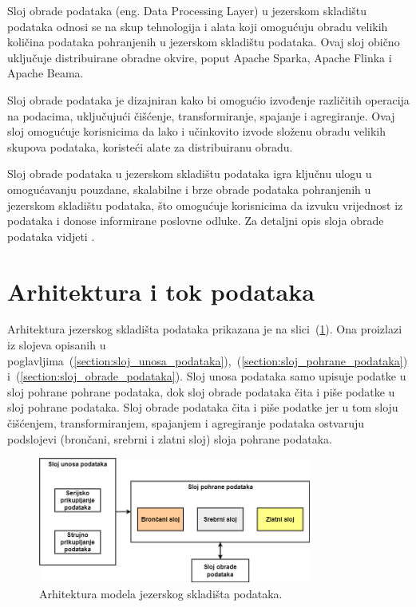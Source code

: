 Sloj obrade podataka (eng. Data Processing Layer) u jezerskom skladištu podataka
odnosi se na skup tehnologija i alata koji omogućuju obradu velikih količina
podataka pohranjenih u jezerskom skladištu podataka. Ovaj sloj obično uključuje
distribuirane obradne okvire, poput Apache Sparka, Apache Flinka i Apache Beama.

Sloj obrade podataka je dizajniran kako bi omogućio izvođenje različitih
operacija na podacima, uključujući čišćenje, transformiranje, spajanje i
agregiranje. Ovaj sloj omogućuje korisnicima da lako i učinkovito izvode složenu
obradu velikih skupova podataka, koristeći alate za distribuiranu obradu.

Sloj obrade podataka u jezerskom skladištu podataka igra ključnu ulogu u
omogućavanju pouzdane, skalabilne i brze obrade podataka pohranjenih u jezerskom
skladištu podataka, što omogućuje korisnicima da izvuku vrijednost iz podataka i
donose informirane poslovne odluke. Za detaljni opis sloja obrade podataka
vidjeti \cite{datalakehouse2022}.

\section{Arhitektura i tok podataka} \label{section:arhitektura_i_tok_podataka}

Arhitektura jezerskog skladišta podataka prikazana je na
slici~(\ref{figure:datalakehouse_architecture}). Ona proizlazi iz slojeva
opisanih u
poglavljima~(\ref{section:sloj_unosa_podataka}),~(\ref{section:sloj_pohrane_podataka})
i~(\ref{section:sloj_obrade_podataka}). Sloj unosa podataka samo upisuje podatke
u sloj pohrane pohrane podataka, dok sloj obrade podataka čita i piše podatke u
sloj pohrane podataka. Sloj obrade podataka čita i piše podatke jer u tom sloju
čišćenjem, transformiranjem, spajanjem i agregiranje podataka ostvaruju
podslojevi (brončani, srebrni i zlatni sloj) sloja pohrane podataka.

\begin{figure}[htb]
    \centering
    \includegraphics[width=0.8\textwidth]{images/arhitektura.drawio.png}
    \caption{Arhitektura modela jezerskog skladišta podataka.}
    \label{figure:datalakehouse_architecture}
\end{figure}

